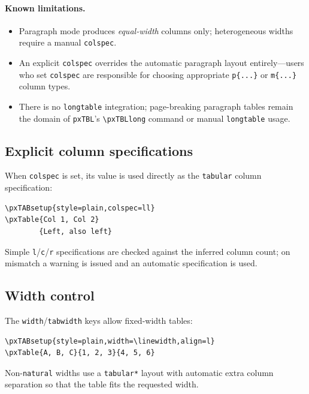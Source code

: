 \documentclass[11pt,a4paper]{article}
\begin{document}
\paragraph{Known limitations.}
\begin{itemize}
  \item Paragraph mode produces \emph{equal-width} columns only;
    heterogeneous widths require a manual \texttt{colspec}.
  \item An explicit \texttt{colspec} overrides the automatic paragraph
    layout entirely---users who set \texttt{colspec} are responsible
    for choosing appropriate \texttt{p\{...\}} or \texttt{m\{...\}}
    column types.
  \item There is no \texttt{longtable} integration; page-breaking
    paragraph tables remain the domain of \texttt{pxTBL}'s
    \verb|\pxTBLlong| command or manual \texttt{longtable} usage.
\end{itemize}

\subsection{Explicit column specifications}

When \texttt{colspec} is set, its value is used directly as the
\texttt{tabular} column specification:

\begin{verbatim}
\pxTABsetup{style=plain,colspec=ll}
\pxTable{Col 1, Col 2}
        {Left, also left}
\end{verbatim}

Simple \texttt{l}/\texttt{c}/\texttt{r} specifications are checked
against the inferred column count; on mismatch a warning is issued
and an automatic specification is used.

\subsection{Width control}

The \texttt{width}/\texttt{tabwidth} keys allow fixed-width tables:

\begin{verbatim}
\pxTABsetup{style=plain,width=\linewidth,align=l}
\pxTable{A, B, C}{1, 2, 3}{4, 5, 6}
\end{verbatim}

Non-\texttt{natural} widths use a \texttt{tabular*} layout with
automatic extra column separation so that the table fits the requested
width.
\end{document}
